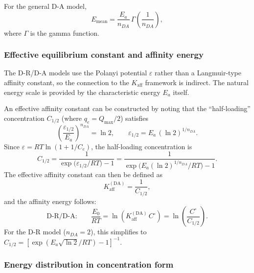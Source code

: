 \documentclass[12pt]{article}
\begin{document}
	For the general D-A model,
	\begin{equation}
		E_{\mathrm{mean}} = \frac{E_a}{n_{DA}}\,
		\Gamma\!\left(\frac{1}{n_{DA}}\right),
		\label{eq:Emean_DA}
	\end{equation}
	where $\Gamma$ is the gamma function.

	\subsubsection{Effective equilibrium constant and affinity energy}

	The D-R/D-A models use the Polanyi potential $\varepsilon$ rather
	than a Langmuir-type affinity constant, so the connection to the
	$K_{\mathrm{aff}}$ framework is indirect.  The natural energy
	scale is provided by the characteristic energy $E_a$ itself.

	An effective affinity constant can be constructed by noting that
	the ``half-loading'' concentration $C_{1/2}$ (where
	$q_e = Q_{\max}/2$) satisfies
	\begin{equation}
		\left(\frac{\varepsilon_{1/2}}{E_a}\right)^{n_{DA}}
		= \ln 2,
		\qquad
		\varepsilon_{1/2}
		= E_a\,(\ln 2)^{1/n_{DA}}.
	\end{equation}
	Since $\varepsilon = RT\ln(1 + 1/C_e)$, the half-loading
	concentration is
	\begin{equation}
		C_{1/2}
		= \frac{1}{\exp\!\bigl(
		\varepsilon_{1/2}/RT\bigr) - 1}
		= \frac{1}{\exp\!\bigl(
		E_a(\ln 2)^{1/n_{DA}}/RT\bigr) - 1}.
		\label{eq:C12_DA}
	\end{equation}
	The effective affinity constant can then be defined as
	\begin{equation}
		K_{\mathrm{aff}}^{\mathrm{(DA)}}
		= \frac{1}{C_{1/2}},
		\label{eq:Kaff_DA}
	\end{equation}
	and the affinity energy follows:
	\begin{equation}
		\text{D-R/D-A:}\qquad
		\frac{E_0}{RT}
		= \ln(K_{\mathrm{aff}}^{\mathrm{(DA)}}\,C^\circ)
		= \ln\!\left(\frac{C^\circ}{C_{1/2}}\right).
		\label{eq:E_DA}
	\end{equation}
	For the D-R model ($n_{DA} = 2$), this simplifies to
	$C_{1/2} = [\exp(E_a\sqrt{\ln 2}/RT) - 1]^{-1}$.

	\subsubsection{Energy distribution in concentration form}
\end{document}
